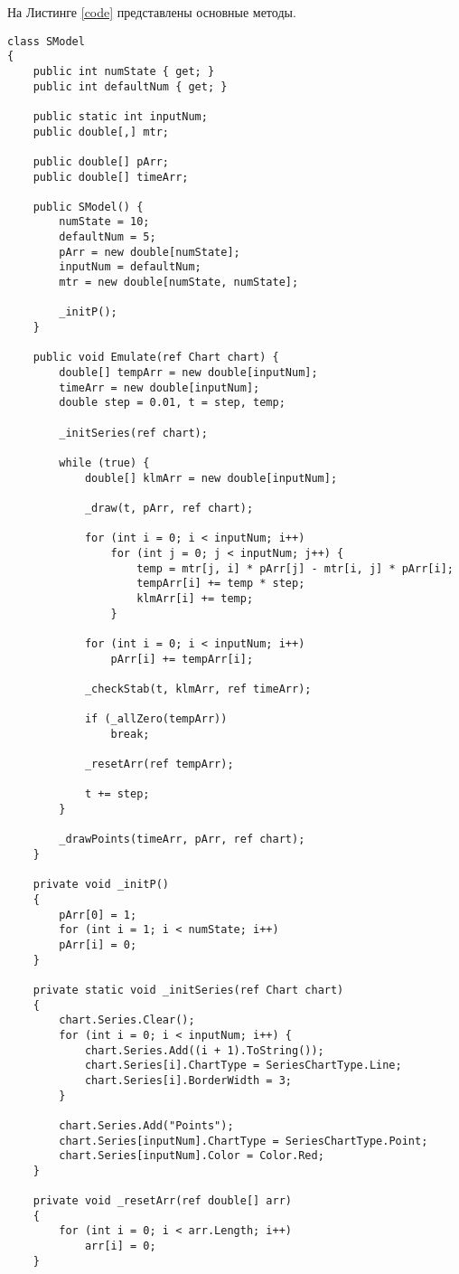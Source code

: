 На Листинге \ref{code} представлены основные методы.

\begin{lstlisting}[label=code, caption = Основные методы]
class SModel
{
	public int numState { get; }
	public int defaultNum { get; }
	
	public static int inputNum;
	public double[,] mtr;
	
	public double[] pArr;
	public double[] timeArr;
	
	public SModel() {
		numState = 10;
		defaultNum = 5;
		pArr = new double[numState];
		inputNum = defaultNum;
		mtr = new double[numState, numState];
		
		_initP();
	}
	
	public void Emulate(ref Chart chart) {
		double[] tempArr = new double[inputNum];
		timeArr = new double[inputNum];
		double step = 0.01, t = step, temp;
		
		_initSeries(ref chart);
		
		while (true) {
			double[] klmArr = new double[inputNum];
			
			_draw(t, pArr, ref chart);
			
			for (int i = 0; i < inputNum; i++)
				for (int j = 0; j < inputNum; j++) {
					temp = mtr[j, i] * pArr[j] - mtr[i, j] * pArr[i];
					tempArr[i] += temp * step;
					klmArr[i] += temp;
				}
			
			for (int i = 0; i < inputNum; i++)
				pArr[i] += tempArr[i];
			
			_checkStab(t, klmArr, ref timeArr);
			
			if (_allZero(tempArr))
				break;
			
			_resetArr(ref tempArr);
			
			t += step;
		}
		
		_drawPoints(timeArr, pArr, ref chart);
	}
	
	private void _initP()
	{
		pArr[0] = 1;
		for (int i = 1; i < numState; i++)
		pArr[i] = 0;
	}
	
	private static void _initSeries(ref Chart chart)
	{
		chart.Series.Clear();
		for (int i = 0; i < inputNum; i++) {
			chart.Series.Add((i + 1).ToString());
			chart.Series[i].ChartType = SeriesChartType.Line;
			chart.Series[i].BorderWidth = 3;
		}
		
		chart.Series.Add("Points");
		chart.Series[inputNum].ChartType = SeriesChartType.Point;
		chart.Series[inputNum].Color = Color.Red;
	}
	
	private void _resetArr(ref double[] arr)
	{
		for (int i = 0; i < arr.Length; i++)
			arr[i] = 0;
	}
	

\end{lstlisting}
